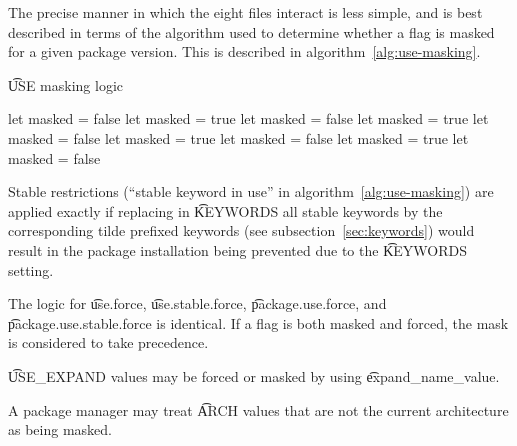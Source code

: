 The precise manner in which the eight files interact is less simple, and is best described in terms
of the algorithm used to determine whether a flag is masked for a given package version. This is
described in algorithm~\ref{alg:use-masking}.
\begin{algorithm}
\caption{\t{USE} masking logic} \label{alg:use-masking}
\begin{algorithmic}[1]
\STATE let masked = false
        \STATE let masked = true
        \STATE let masked = false
    \ENDIF
            \STATE let masked = true
            \STATE let masked = false
        \ENDIF
    \ENDIF
            \STATE let masked = true
            \STATE let masked = false
        \ENDIF
    \ENDFOR
                \STATE let masked = true
                \STATE let masked = false
            \ENDIF
        \ENDFOR
    \ENDIF
\ENDFOR
\end{algorithmic}
\end{algorithm}

Stable restrictions (``stable keyword in use'' in algorithm~\ref{alg:use-masking}) are applied
exactly if replacing in \t{KEYWORDS} all stable keywords by the corresponding tilde prefixed
keywords (see subsection~\ref{sec:keywords}) would result in the package installation being
prevented due to the \t{KEYWORDS} setting.

The logic for \t{use.force}, \t{use.stable.force}, \t{package.use.force}, and
\t{package.use.\allowbreak stable.force} is identical. If a flag is both masked and forced, the
mask is considered to take precedence.

\t{USE_EXPAND} values may be forced or masked by using \t{expand_name_value}.

A package manager may treat \t{ARCH} values that are not the current architecture as being masked.




